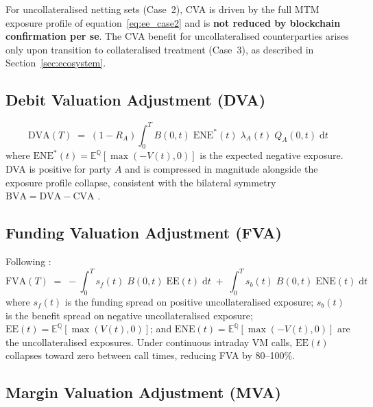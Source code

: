 \documentclass[12pt,letterpaper]{article}
\numberwithin{equation}{section}
\theoremstyle{remark}
\newcommand{\EQ}{\mathbb{E}^{\mathbb{Q}}}          %
\newcommand{\EE}{\mathrm{EE}}
\newcommand{\ENE}{\mathrm{ENE}}
\newcommand{\df}{B(0,t)}
\newcommand{\surv}[1]{Q_{#1}(0,t)}
\newcommand{\hz}[1]{\lambda_{#1}(t)}
\begin{document}
For uncollateralised netting sets (Case~2), CVA is driven by the full
MTM exposure profile of equation~\eqref{eq:ee_case2} and is \textbf{not
reduced by blockchain confirmation per se}. The CVA benefit for
uncollateralised counterparties arises only upon transition to
collateralised treatment (Case~3), as described in
Section~\ref{sec:ecosystem}.

\subsection{Debit Valuation Adjustment (DVA)}

\begin{equation}
  \mathrm{DVA}(T) \;=\; (1-R_A)
  \int_0^T \!\df\;\ENE^{*}(t)\;\hz{A}\;\surv{A}\;\mathrm{d}t
  \label{eq:dva}
\end{equation}
where $\ENE^{*}(t) = \EQ[\max(-V(t),0)]$ is the expected negative exposure.
DVA is positive for party $A$ and is compressed in magnitude alongside the
exposure profile collapse, consistent with the bilateral symmetry
$\mathrm{BVA} = \mathrm{DVA} - \mathrm{CVA}$ \citep{gregory_2020}.

\subsection{Funding Valuation Adjustment (FVA)}

Following \citet{burgard_kjaer_2013}:
\begin{equation}
  \mathrm{FVA}(T) \;=\;
  -\int_0^T s_f(t)\;\df\;\EE(t)\;\mathrm{d}t
  \;+\;\int_0^T s_b(t)\;\df\;\ENE(t)\;\mathrm{d}t
  \label{eq:fva}
\end{equation}
where $s_f(t)$ is the funding spread on positive uncollateralised exposure;
$s_b(t)$ is the benefit spread on negative uncollateralised exposure;
$\EE(t) = \EQ[\max(V(t),0)]$; and $\ENE(t) = \EQ[\max(-V(t),0)]$ are the
uncollateralised exposures. Under continuous intraday VM calls, $\EE(t)$
collapses toward zero between call times, reducing FVA by 80--100\%.

\subsection{Margin Valuation Adjustment (MVA)}
\label{subsec:mva}
\end{document}
